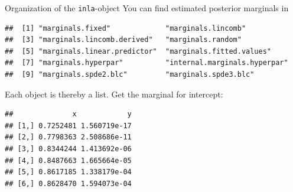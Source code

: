 \documentclass[
  handout]{beamer}
\newenvironment{Shaded}{\begin{snugshade}}{\end{snugshade}}
\newcommand{\DecValTok}[1]{\textcolor[rgb]{0.00,0.00,0.81}{#1}}
\newcommand{\FunctionTok}[1]{\textcolor[rgb]{0.00,0.00,0.00}{#1}}
\newcommand{\NormalTok}[1]{#1}
\newcommand{\SpecialCharTok}[1]{\textcolor[rgb]{0.00,0.00,0.00}{#1}}
\begin{document}
\begin{frame}[fragile]{Organization of the \texttt{inla}-object}
\protect\hypertarget{organization-of-the-inla-object-2}{}
You can find estimated posterior marginals in \small

\begin{verbatim}
##  [1] "marginals.fixed"             "marginals.lincomb"          
##  [3] "marginals.lincomb.derived"   "marginals.random"           
##  [5] "marginals.linear.predictor"  "marginals.fitted.values"    
##  [7] "marginals.hyperpar"          "internal.marginals.hyperpar"
##  [9] "marginals.spde2.blc"         "marginals.spde3.blc"
\end{verbatim}

\normalsize

Each object is thereby a list. Get the marginal for intercept:

\scriptsize

\begin{Shaded}
\end{Shaded}

\begin{verbatim}
##              x            y
## [1,] 0.7252481 1.560719e-17
## [2,] 0.7798363 2.508686e-11
## [3,] 0.8344244 1.413692e-06
## [4,] 0.8487663 1.665664e-05
## [5,] 0.8617185 1.338179e-04
## [6,] 0.8628470 1.594073e-04
\end{verbatim}

\normalsize
\end{frame}
\end{document}
